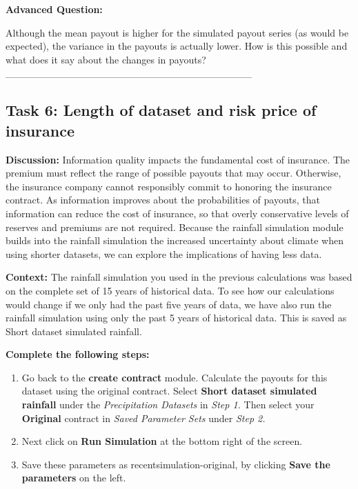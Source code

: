\documentclass[letterpaper,10pt,english]{sphinxmanual}
\begin{document}
\textbf{Advanced Question:}

Although the mean payout is higher for the simulated payout series (as would be expected), the variance in the payouts is actually lower. How is this possible and what does it say about the changes in payouts? \_\_\_\_\_\_\_\_\_\_\_\_\_\_\_\_\_\_\_\_\_\_\_\_\_\_\_\_\_\_\_\_\_\_


\subsection{Task 6: Length of dataset and risk price of insurance}
\label{wiiet/wiiet_influenceshortdatasets_Web:task-6-length-of-dataset-and-risk-price-of-insurance}
\textbf{Discussion:} Information quality impacts the fundamental cost of insurance. The premium must reflect the range of possible payouts that may occur. Otherwise, the insurance company cannot responsibly commit to honoring the insurance contract. As information improves about the probabilities of payouts, that information can reduce the cost of insurance, so that overly conservative levels of reserves and premiums are not required. Because the rainfall simulation module builds into the rainfall simulation the increased uncertainty about climate when using shorter datasets, we can explore the implications of having less data.

\textbf{Context:} The rainfall simulation you used in the previous calculations was based on the complete set of 15 years of historical data. To see how our calculations would change if we only had the past five years of data, we have also run the rainfall simulation using only the past 5 years of historical data. This is saved as Short dataset simulated rainfall.

\textbf{Complete the following steps:}
\begin{enumerate}
\item {} 
Go back to the \textbf{create contract} module. Calculate the payouts for this dataset using the original contract.  Select \textbf{Short dataset simulated rainfall} under the \emph{Precipitation Datasets} in \emph{Step 1.} Then select your \textbf{Original} contract in \emph{Saved Parameter Sets} under \emph{Step 2.}

\item {} 
Next click on \textbf{Run Simulation} at the bottom right of the screen.

\item {} 
Save these parameters as recentsimulation-original, by clicking \textbf{Save the parameters} on the left.

\end{enumerate}
\end{document}
